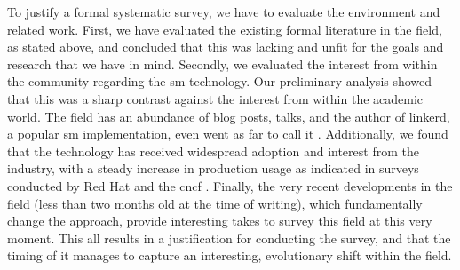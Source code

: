 To justify a formal systematic survey, we have to evaluate the environment and related work. First, we have evaluated the existing formal literature in the field, as stated above, and concluded that this was lacking and unfit for the goals and research that we have in mind. Secondly, we evaluated the interest from within the community regarding the \gls{sm} technology. Our preliminary analysis showed that this was a sharp contrast against the interest from within the academic world. The field has an abundance of blog posts, talks, and the author of \gls{linkerd}, a popular \gls{sm} implementation, even went as far to call it  \cite{service-mesh-hype}. Additionally, we found that the technology has received widespread adoption and interest from the industry, with a steady increase in production usage as indicated in surveys conducted by Red Hat \cite{rh-survey} and the \gls{cncf} \cite{cncf-survey-2020}. Finally, the very recent developments \cite{istio-merbridge, cilium-mesh} in the field (less than two months old at the time of writing), which fundamentally change the approach, provide  interesting takes to survey this field at this very moment. This all results in a justification for conducting the survey, and that the timing of it manages to capture an interesting, evolutionary shift within the field.

